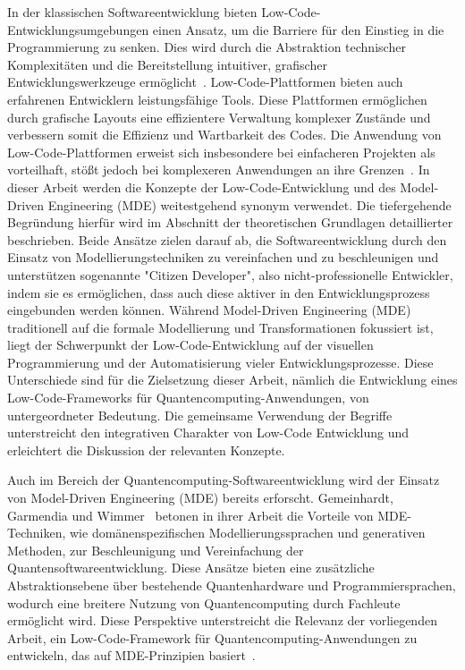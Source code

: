 In der klassischen Softwareentwicklung bieten Low-Code-Entwicklungsumgebungen einen Ansatz, 
um die Barriere für den Einstieg in die Programmierung zu senken. Dies wird durch die 
Abstraktion technischer Komplexitäten und die Bereitstellung intuitiver, grafischer 
Entwicklungswerkzeuge ermöglicht~\cite{Juhas2022}. Low-Code-Plattformen bieten auch 
erfahrenen Entwicklern leistungsfähige Tools. 
Diese Plattformen ermöglichen durch grafische Layouts eine effizientere Verwaltung komplexer 
Zustände und verbessern somit die Effizienz und Wartbarkeit des Codes. Die
Anwendung von Low-Code-Plattformen erweist sich insbesondere bei
einfacheren Projekten als vorteilhaft, stößt jedoch bei komplexeren
Anwendungen an ihre Grenzen~\cite{Buscher2022}. 
In dieser Arbeit werden die Konzepte der Low-Code-Entwicklung und des Model-Driven Engineering (MDE) 
weitestgehend synonym verwendet. Die tiefergehende Begründung hierfür 
wird im Abschnitt der theoretischen Grundlagen detaillierter beschrieben. 
Beide Ansätze zielen darauf ab, die Softwareentwicklung durch 
den Einsatz von Modellierungstechniken zu vereinfachen und zu beschleunigen und 
unterstützen sogenannte "Citizen Developer", also nicht-professionelle Entwickler, 
indem sie es ermöglichen, dass auch diese aktiver in den Entwicklungsprozess eingebunden werden können.
Während Model-Driven Engineering (MDE) traditionell auf die formale Modellierung und 
Transformationen fokussiert ist, liegt der Schwerpunkt der Low-Code-Entwicklung auf der 
visuellen Programmierung und der Automatisierung vieler Entwicklungsprozesse. 
Diese Unterschiede sind für die Zielsetzung dieser Arbeit, nämlich die Entwicklung eines 
Low-Code-Frameworks für Quantencomputing-Anwendungen, von untergeordneter Bedeutung. 
Die gemeinsame Verwendung der Begriffe unterstreicht den integrativen Charakter 
von Low-Code Entwicklung und erleichtert die Diskussion der relevanten Konzepte. 


Auch im Bereich der Quantencomputing-Softwareentwicklung wird der Einsatz von 
Model-Driven Engineering (MDE) bereits erforscht. Gemeinhardt, Garmendia und Wimmer~\cite{gemeinhardt_2021} 
betonen in ihrer Arbeit die Vorteile von MDE-Techniken, wie domänenspezifischen 
Modellierungssprachen und generativen Methoden, zur Beschleunigung und Vereinfachung 
der Quantensoftwareentwicklung. Diese Ansätze bieten eine zusätzliche Abstraktionsebene 
über bestehende Quantenhardware und Programmiersprachen, wodurch eine breitere Nutzung 
von Quantencomputing durch Fachleute ermöglicht wird. Diese Perspektive unterstreicht 
die Relevanz der vorliegenden Arbeit, ein Low-Code-Framework für Quantencomputing-Anwendungen 
zu entwickeln, das auf MDE-Prinzipien basiert~\cite{gemeinhardt_2021}.

